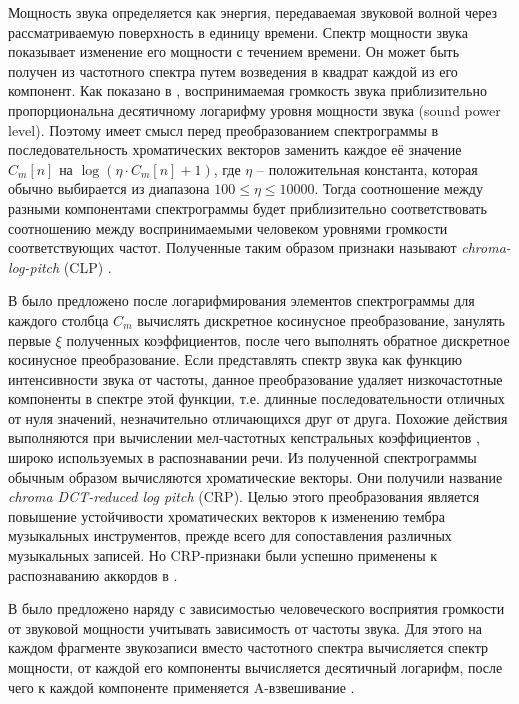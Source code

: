 Мощность звука определяется как энергия, передаваемая звуковой волной через
рассматриваемую поверхность в единицу времени. Спектр мощности звука показывает
изменение его мощности с течением времени. Он может быть получен из частотного
спектра путем возведения в квадрат каждой из его компонент. Как показано в
\cite{Fletcher1933}, воспринимаемая громкость звука приблизительно
пропорциональна десятичному логарифму уровня мощности звука (sound power
level). Поэтому имеет смысл перед преобразованием спектрограммы в
последовательность хроматических векторов заменить каждое её значение $C_m[n]$
на $\log (\eta \cdot C_m[n] + 1)$, где $\eta$ -- положительная константа,
которая обычно выбирается из диапазона $100 \leq \eta \leq 10000$. Тогда
соотношение между разными компонентами спектрограммы будет приблизительно
соответствовать соотношению между воспринимаемыми человеком уровнями громкости
соответствующих частот. Полученные таким образом признаки называют
\emph{chroma-log-pitch} (CLP) \cite{Jiang2011}.

В \cite{Mueller2009} было предложено после логарифмирования элементов
спектрограммы для каждого столбца $C_m$ вычислять дискретное косинусное
преобразование, занулять первые $\xi$ полученных коэффициентов, после чего
выполнять обратное дискретное косинусное преобразование. Если представлять
спектр звука как функцию интенсивности звука от частоты, данное преобразование
удаляет низкочастотные компоненты в спектре этой функции, т.е. длинные
последовательности отличных от нуля значений, незначительно отличающихся друг от
друга. Похожие действия выполняются при вычислении мел-частотных кепстральных
коэффициентов \cite{Logan2000}, широко используемых в распознавании речи. Из
полученной спектрограммы обычным образом вычисляются хроматические векторы. Они
получили название \emph{chroma DCT-reduced log pitch} (CRP). Целью этого
преобразования является повышение устойчивости хроматических векторов к
изменению тембра музыкальных инструментов, прежде всего для сопоставления
различных музыкальных записей. Но CRP-признаки были успешно применены к
распознаванию аккордов в \cite{Cho2011}.

В \cite{Ni2011} было предложено наряду с зависимостью человеческого восприятия
громкости от звуковой мощности учитывать зависимость от частоты звука. Для этого
на каждом фрагменте звукозаписи вместо частотного спектра вычисляется спектр
мощности, от каждой его компоненты вычисляется десятичный логарифм, после чего к
каждой компоненте применяется A-взвешивание \cite{TalbotSmith1999}.

